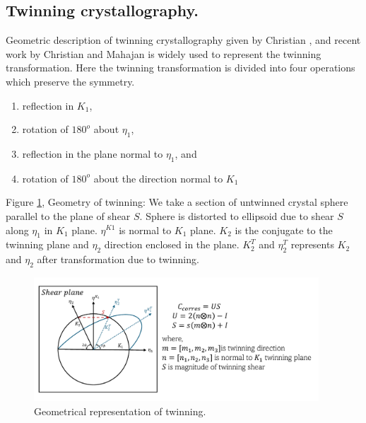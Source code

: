 \subsection{Twinning crystallography.}
\label{sec:twinning_crystallography}
Geometric description of twinning crystallography given by Christian \cite{CHRISTIAN2002859}, and recent work by Christian and Mahajan \cite{CHRISTIAN19951} is widely used to represent the twinning transformation. Here the twinning transformation is divided into four operations which preserve the symmetry.
\vspace{-0.8em}
\begin{enumerate}
    \item reflection in $K_1$,
    \vspace{-0.8em}
    \item rotation of $180^o$ about $\eta_1$,
    \vspace{-0.8em}
    \item reflection in the plane normal to $\eta_1$, and
    \vspace{-0.8em}
    \item rotation of $180^o$ about the direction normal to $K_1$
\end{enumerate}
\vspace{-0.8em}
Figure \ref{fig:Geomtery of twinning}, Geometry of twinning: We take a section of untwinned crystal sphere parallel to the plane of shear $S$. Sphere is distorted to ellipsoid due to shear $S$ along $\eta_1$ in $K_1$ plane. $\eta^{K1}$ is normal to $K_1$ plane. $K_2$ is the conjugate to the twinning plane and $\eta_2$ direction enclosed in the plane. $K_2^T$ and $\eta_2^T$ represents $K_2$ and $\eta_2$ after transformation due to twinning.

\begin{figure}[ht]
    \centering
    \includegraphics[width=0.95\textwidth]{images/Correspondence_matrix_theory.pdf}
    \caption{Geometrical representation of twinning.}
    \label{fig:Geomtery of twinning}
\end{figure}

